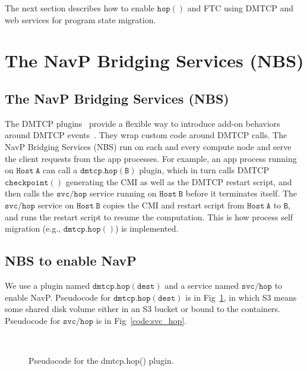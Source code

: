 \documentclass[conference]{IEEEtran}
\begin{document}
The next section describes how to enable $\mathtt{hop()}$ and FTC using DMTCP and web services for program state migration.


\section{The NavP Bridging Services (NBS) }
\label{sec:s2}

\subsection{The NavP Bridging Services (NBS)}
\label{subsec:s21}

The DMTCP plugins~\cite{dmtcp-openproc-2013} provide a flexible way to introduce add-on behaviors around DMTCP events~\cite{ansel2009dmtcp}. They wrap custom code around DMTCP calls. The NavP Bridging Services (NBS) run on each and every compute node and serve the client requests from the app processes. For example, an app process running on $\mathtt{Host~A}$ can call a $\mathtt{dmtcp.hop(B)}$ plugin, which in turn calls DMTCP $\mathtt{checkpoint()}$ generating the CMI as well as the DMTCP restart script, and then calls the $\mathtt{svc/hop}$ service running on $\mathtt{Host~B}$ before it terminates itself. The $\mathtt{svc/hop}$ service on $\mathtt{Host~B}$ copies the CMI and restart script from $\mathtt{Host~A}$ to $\mathtt{B}$, and runs the restart script to resume the computation. This is how process self migration (e.g., $\mathtt{dmtcp.hop()}$) is implemented.

\subsection{NBS to enable NavP}
\label{subsec:s22}

We use a plugin named $\mathtt{dmtcp.hop(dest)}$ and a service named $\mathtt{svc/hop}$ to enable NavP. 
Pseudocode for $\mathtt{dmtcp.hop(dest)}$ is in Fig~\ref{code:dmtcp_hop}, in which S3 means some shared disk volume either 
in an S3 bucket or bound to the containers. Pseudocode for $\mathtt{svc/hop}$ is in Fig~\ref{code:svc_hop}.

\begin{figure}[!ht]
\begin{center}
\begin{center}
\mbox{}\\[0.3em]
\end{center}
\hspace{\fill}%
\caption{Pseudocode for the dmtcp.hop() plugin.}
\label{code:dmtcp_hop}
\end{center}
\end{figure}
\end{document}
